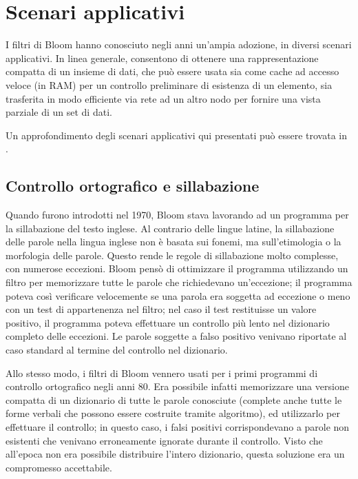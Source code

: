 \section{Scenari applicativi}
\label{sec:bloom:scenari}

I filtri di Bloom hanno conosciuto negli anni un'ampia adozione, in diversi scenari applicativi. 
In linea generale, consentono di ottenere una rappresentazione compatta di un insieme di dati,
che può essere usata sia come cache ad accesso veloce (in RAM) per un controllo preliminare
di esistenza di un elemento, sia trasferita in modo efficiente via rete ad un altro nodo per
fornire una vista parziale di un set di dati.

Un approfondimento degli scenari applicativi qui presentati può essere trovata in
\cite{bloom-network}.

\subsection{Controllo ortografico e sillabazione}

Quando furono introdotti nel 1970, Bloom stava lavorando ad un programma per la sillabazione del
testo inglese. Al contrario delle lingue latine, la sillabazione delle parole nella lingua inglese 
non è basata sui fonemi, ma sull'etimologia o la morfologia delle parole. Questo rende le regole
di sillabazione molto complesse, con numerose eccezioni. Bloom pensò di ottimizzare il programma
utilizzando un filtro per memorizzare tutte le parole che richiedevano un'eccezione; il programma
poteva così verificare velocemente se una parola era soggetta ad eccezione o meno con un test
di appartenenza nel filtro; nel caso il test restituisse un valore positivo, il programma poteva
effettuare un controllo più lento nel dizionario completo delle eccezioni. Le parole soggette
a falso positivo venivano riportate al caso standard al termine del controllo nel dizionario.

Allo stesso modo, i filtri di Bloom vennero usati per i primi programmi di controllo ortografico
negli anni 80. Era possibile infatti memorizzare una versione compatta di un dizionario di tutte le
parole conosciute (complete anche tutte le forme verbali che possono essere costruite tramite
algoritmo), ed utilizzarlo per effettuare il controllo; in questo caso, i falsi positivi
corrispondevano a parole non esistenti che venivano erroneamente ignorate durante il controllo.
Visto che all'epoca non era possibile distribuire l'intero dizionario, questa soluzione era un
compromesso accettabile.

